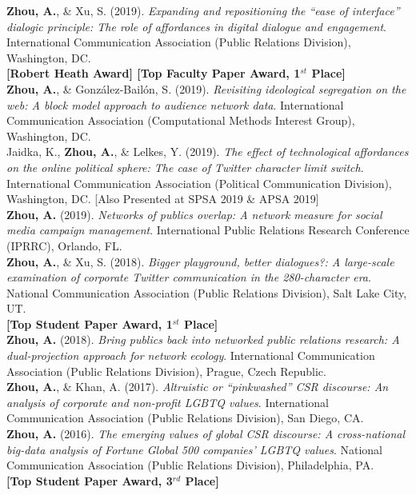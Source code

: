 \documentclass[12pt, letterpaper]{article}
\newcommand{\years}[1]{\marginnote{\normalsize #1}}
\begin{document}
{\years{[8]} \textbf{Zhou, A.}, \& Xu, S. (2019). \textit{Expanding and repositioning the ``ease of interface'' dialogic principle: The role of affordances in digital dialogue and engagement}. International Communication Association (Public Relations Division), Washington, DC.\\
\years{} \textbf{[Robert Heath Award] [Top Faculty Paper Award, 1$^{st}$ Place]}\\
\years{[7]} \textbf{Zhou, A.}, \& González-Bailón, S. (2019). \textit{Revisiting ideological segregation on the web: A block model approach to audience network data}. International Communication Association (Computational Methods Interest Group), Washington, DC.\\
\years{[6]} Jaidka, K., \textbf{Zhou, A.}, \& Lelkes, Y. (2019). \textit{The effect of technological affordances on the online political sphere: The case of Twitter character limit switch}. International Communication Association (Political Communication Division), Washington, DC. [Also Presented at SPSA 2019 \& APSA 2019]\\
\years{[5]} \textbf{Zhou, A.} (2019). \textit{Networks of publics overlap: A network measure for social media campaign management}. International Public Relations Research Conference (IPRRC), Orlando, FL.\\
\years{[4]} \textbf{Zhou, A.}, \& Xu, S. (2018). \textit{Bigger playground, better dialogues?: A large-scale examination of corporate Twitter communication in the 280-character era}. National Communication Association (Public Relations Division), Salt Lake City, UT.\\
\years{} \textbf{[Top Student Paper Award, 1$^{st}$ Place]}\\
\years{[3]} \textbf{Zhou, A.} (2018). \textit{Bring publics back into networked public relations research: A dual-projection approach for network ecology}. International Communication Association (Public Relations Division), Prague, Czech Republic.\\
\years{[2]} \textbf{Zhou, A.}, \& Khan, A. (2017). \textit{Altruistic or ``pinkwashed'' CSR discourse: An analysis of corporate and non-profit LGBTQ values}. International Communication Association (Public Relations Division), San Diego, CA.\\
\years{[1]} \textbf{Zhou, A.} (2016). \textit{The emerging values of global CSR discourse: A cross-national big-data analysis of Fortune Global 500 companies' LGBTQ values}. National Communication Association (Public Relations Division), Philadelphia, PA.\\
\years{} \textbf{[Top Student Paper Award, 3$^{rd}$ Place]}

}
\end{document}
